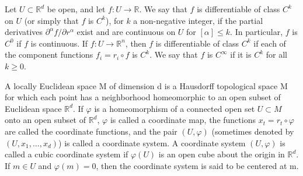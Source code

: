 \begin{definition}\label{thm:1.2}
	Let $U \subset \mathbb{R}^d$ be open, and let $f: U \to \mathbb{R}$. We say that $f$ is differentiable of
	class $C^k$ on $U$ (or simply that $f$ is $C^k$), for $k$ a non-negative
	integer, if the partial derivatives $\partial^{\alpha}f/\partial r^{\alpha}$
	exist and are continuous on $U$ for $[\alpha] \leq k$. In particular,
	$f$ is $C^0$ if $f$ is continuous. If $f: U \to \mathbb{R}^n$, then $f$
	is differentiable of class $C^k$ if each of the component functions
	$f_i = r_i \circ f$ is $C^k$. We say that $f$ is $C^\infty$
	if it is $C^k$ for all $k \geq 0$. 
\end{definition}

\begin{definition}\label{thm:1.3}
	A locally Euclidean space M of dimension d is a Hausdorff topological
	space M for which each point has a neighborhood homeomorphic to an
	open subset of Euclidean space $\mathbb{R}^{d}$. If  $ \varphi $
	is a homeomorphism of a connected open set  $ U \subset M $ onto an
	open subset of $\mathbb{R}^{d}$,  $ \varphi $ is called a coordinate map,
	the functions  $ x_t = r_t \circ \varphi $ are called the coordinate
	functions, and the pair  $ (U, \varphi) $ (sometimes denoted by
	$ (U, x_1, \ldots, x_d) $) is called a coordinate system. A coordinate system
	$ (U, \varphi) $ is called a cubic coordinate system if $\varphi(U)$ is
	an open cube about the origin in $\mathbb{R}^{d}$. If  $ m \in U $ and
	$ \varphi(m) = 0 $, then the coordinate system is said to be centered at m.
\end{definition}

